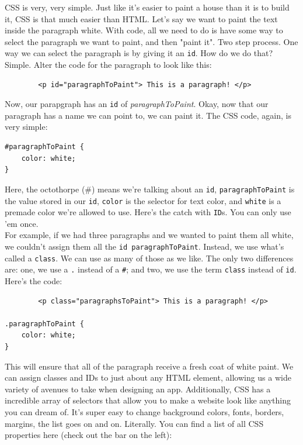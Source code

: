 \documentclass[12pt, letterpaper]{article}
\begin{document}
CSS is very, very simple. Just like it's easier to paint a house than it is to build it, CSS is that much easier than
HTML. Let's say we want to paint the text inside the paragraph white. With code, all we need to do is have some way
to select the paragraph we want to paint, and then "paint it". Two step process. One way we can select the paragraph is
by giving it an \verb+id+. How do we do that? Simple. Alter the code for the paragraph to look like this:

\begin{verbatim}
        <p id="paragraphToPaint"> This is a paragraph! </p>
\end{verbatim}

Now, our parapgraph has an \verb+id+ of \emph{paragraphToPaint}. Okay, now that our paragraph has a name we can point to,
we can paint it. The CSS code, again, is very simple:

\begin{verbatim}
#paragraphToPaint {
    color: white;
}
\end{verbatim}

Here, the octothorpe (\#) means we're talking about an \verb+id+, \verb+paragraphToPaint+ is the value stored in our
\verb+id+, \verb+color+ is the selector for text color, and \verb+white+ is a premade color we're allowed to use. Here's the 
catch with \verb+ID+s. You can only use 'em once. \\

For example, if we had three paragraphs and we wanted to paint them
all white, we couldn't assign them all the \verb+id paragraphToPaint+. Instead, we use what's called a \verb+class+.
We can use as many of those as we like. The only two differences are: one, we use a \verb+.+ instead of a \verb+#+; 
and two, we use the term \verb+class+ instead of \verb+id+. Here's the code:

\begin{verbatim}
        <p class="paragraphsToPaint"> This is a paragraph! </p>

.paragraphToPaint {
    color: white;
}
\end{verbatim}

This will ensure that all of the paragraph receive a fresh coat of white paint. We can assign classes and IDs to just
about any HTML element, allowing us a wide variety of avenues to take when designing an app. Additionally, CSS has a
incredible array of selectors that allow you to make a website look like anything you can dream of. It's super easy
to change background colors, fonts, borders, margins, the list goes on and on. Literally. You can find a list of
all CSS properties here (check out the bar on the left):
\end{document}
